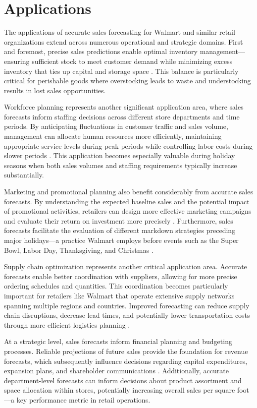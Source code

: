 \section{Applications}

The applications of accurate sales forecasting for Walmart and similar retail organizations extend across numerous operational and strategic domains. First and foremost, precise sales predictions enable optimal inventory management—ensuring sufficient stock to meet customer demand while minimizing excess inventory that ties up capital and storage space \cite{Zhang:2021}. This balance is particularly critical for perishable goods where overstocking leads to waste and understocking results in lost sales opportunities.

Workforce planning represents another significant application area, where sales forecasts inform staffing decisions across different store departments and time periods. By anticipating fluctuations in customer traffic and sales volume, management can allocate human resources more efficiently, maintaining appropriate service levels during peak periods while controlling labor costs during slower periods \cite{Fildes:2019}. This application becomes especially valuable during holiday seasons when both sales volumes and staffing requirements typically increase substantially.

Marketing and promotional planning also benefit considerably from accurate sales forecasts. By understanding the expected baseline sales and the potential impact of promotional activities, retailers can design more effective marketing campaigns and evaluate their return on investment more precisely \cite{Zhang:2021}. Furthermore, sales forecasts facilitate the evaluation of different markdown strategies preceding major holidays—a practice Walmart employs before events such as the Super Bowl, Labor Day, Thanksgiving, and Christmas \cite{Loyal:2017}.

Supply chain optimization represents another critical application area. Accurate forecasts enable better coordination with suppliers, allowing for more precise ordering schedules and quantities. This coordination becomes particularly important for retailers like Walmart that operate extensive supply networks spanning multiple regions and countries. Improved forecasting can reduce supply chain disruptions, decrease lead times, and potentially lower transportation costs through more efficient logistics planning \cite{Fildes:2019}.

At a strategic level, sales forecasts inform financial planning and budgeting processes. Reliable projections of future sales provide the foundation for revenue forecasts, which subsequently influence decisions regarding capital expenditures, expansion plans, and shareholder communications \cite{Zhang:2021}. Additionally, accurate department-level forecasts can inform decisions about product assortment and space allocation within stores, potentially increasing overall sales per square foot—a key performance metric in retail operations.

